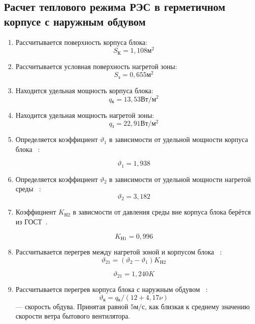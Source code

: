 \subsection{Расчет теплового режима РЭС в герметичном корпусе с наружным обдувом}

\begin{enumerate}[label={\arabic*.}]
\item Рассчитывается поверхность корпуса блока: %
  $$S\mathrm{_{К}}=1,108\mathrm{м^2}$$

\item Рассчитывается условная поверхность нагретой зоны: %
  $$S\mathrm{_{з}} = 0,655\mathrm{м^2}$$ 
\item Находится удельная мощность корпуса блока:  %
  $$q\mathrm{_к} = 13,53\mathrm{Вт/м^2}$$

\item Находится удельная мощность нагретой зоны: %
  $$q\mathrm{_з} = 22,91 \mathrm{ Вт/м^2}$$

\item Определяется коэффициент $\vartheta_1$ в зависимости от удельной мощности корпуса блока ~\cite{Rotkop1976}:

  $$\vartheta_1=1,938$$
\item Определяется коэффициент $\vartheta_2$ в зависимости от удельной мощности нагретой среды ~\cite{Rotkop1976}:
  $$\vartheta_2=3,182$$
  

\item Коэффициент $K\mathrm{_{Н2}}$ в зависмости от давления
  среды вне корпуса блока берётся из ГОСТ~\cite{GOST-15150-69}.

  $$K\mathrm{_{Н1}} = 0,996$$

\item Рассчитывается перегрев между нагретой зоной и корпусом блока
  ~\cite{Rotkop1976}:
  \begin{equation}
    \vartheta_{21} = (\vartheta_{2}-\vartheta_{1})K\mathrm{_{Н2}}
    \end{equation}

    $$\vartheta_{21}=1,240 K$$

\item Рассчитывается перегрев корпуса блока с наружным обдувом
    ~\cite{Rotkop1976}:
    \begin{equation}
      \vartheta\mathrm{_к} = q\mathrm{_к}/(12 + 4,17 \nu)
      \end{equation}
      \nu — скорость обдува. Принятая равной $5\mathrm{м/с}$,
      как близкая к среднему значению скорости ветра бытового
вентилятора.


\end{enumerate}
